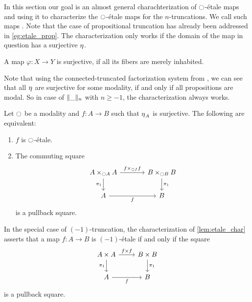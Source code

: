 \documentclass[9pt,twosided]{amsart}
\begin{document}
In this section our goal is an almost general charachterization of ${\ocircle}$-étale maps and using it to characterize the ${\ocircle}$-\'etale maps for the $n$-truncations. We call such maps . Note that the case of propositional truncation has already been addressed in \cref{eg:etale_prop}.
The characterization only works if the domain of the map in question has a surjective ${\eta_{}}$.
\begin{defn}
  A map $\varphi:X\to Y$ is surjective, if all its fibers are merely inhabited.
\end{defn}
Note that using the connected-truncated factorization system from \cite{RijkeSpittersShulman}, we can see that all ${\eta_{}}$ are surjective for some modality, if and only if all propositions are modal.
So in case of $\trunc{n}{\_}$ with $n\geq -1$, the characterization always works.

\begin{lem}\label{lem:etale_char}
Let ${\ocircle}$ be a modality and $f:A\to B$ such that ${\eta_{}}_A$ is surjective. The following are equivalent:
\begin{enumerate}
\item $f$ is ${\ocircle}$-\'etale.
\item The commuting square
\begin{equation*}
\begin{tikzcd}[column sep=large]
A\times_{\modal A} A \arrow[d,swap,"\pi_1"] \arrow[r,"{f\times_{\modal f} f}"] & B\times_{\modal B} B \arrow[d,"\pi_1"] \\
A \arrow[r,swap,"f"] & B
\end{tikzcd}
\end{equation*}
is a pullback square.
\end{enumerate}
\end{lem}

\begin{rmk}
In the special case of $(-1)$-truncation, the characterization of \cref{lem:etale_char} asserts that a map $f:A\to B$ is $(-1)$-\'etale if and only if the square
\begin{equation*}
\begin{tikzcd}
A\times A \arrow[d,swap,"\pi_1"] \arrow[r,"{f\times f}"] & B\times B \arrow[d,"\pi_1"] \\
A \arrow[r,swap,"f"] & B
\end{tikzcd}
\end{equation*}
is a pullback square.
\end{rmk}
\end{document}
